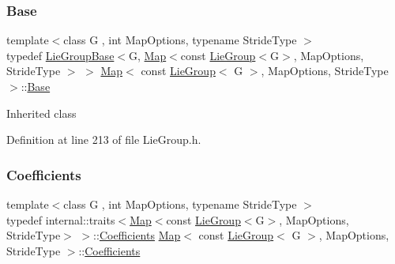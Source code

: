 \subsubsection{\texorpdfstring{Base}{Base}}
{\footnotesize\ttfamily template$<$class G , int Map\+Options, typename Stride\+Type $>$ \\
typedef \hyperlink{class_lie_group_base}{Lie\+Group\+Base}$<$G, \hyperlink{class_map_3_01const_01_lie_group_3_01_g_01_4_00_01_map_options_00_01_stride_type_01_4_a95174b5f6c93ceefa0fbc6ef6fdf65f7}{Map}$<$const \hyperlink{class_lie_group}{Lie\+Group}$<$G$>$, Map\+Options, Stride\+Type $>$ $>$ \hyperlink{class_map_3_01const_01_lie_group_3_01_g_01_4_00_01_map_options_00_01_stride_type_01_4_a95174b5f6c93ceefa0fbc6ef6fdf65f7}{Map}$<$ const \hyperlink{class_lie_group}{Lie\+Group}$<$ G $>$, Map\+Options, Stride\+Type $>$\+::\hyperlink{class_map_3_01const_01_lie_group_3_01_g_01_4_00_01_map_options_00_01_stride_type_01_4_ae8127dbfe0e6b6b515d319062f495883}{Base}\hspace{0.3cm}{\ttfamily [protected]}}

Inherited class 

Definition at line 213 of file Lie\+Group.\+h.

\hypertarget{class_map_3_01const_01_lie_group_3_01_g_01_4_00_01_map_options_00_01_stride_type_01_4_a670729f8e6ab1131541ef46da7d09274}{}\label{class_map_3_01const_01_lie_group_3_01_g_01_4_00_01_map_options_00_01_stride_type_01_4_a670729f8e6ab1131541ef46da7d09274} 
\subsubsection{\texorpdfstring{Coefficients}{Coefficients}}
{\footnotesize\ttfamily template$<$class G , int Map\+Options, typename Stride\+Type $>$ \\
typedef internal\+::traits$<$\hyperlink{class_map_3_01const_01_lie_group_3_01_g_01_4_00_01_map_options_00_01_stride_type_01_4_a95174b5f6c93ceefa0fbc6ef6fdf65f7}{Map}$<$const \hyperlink{class_lie_group}{Lie\+Group}$<$G$>$, Map\+Options, Stride\+Type$>$ $>$\+::\hyperlink{class_map_3_01const_01_lie_group_3_01_g_01_4_00_01_map_options_00_01_stride_type_01_4_a670729f8e6ab1131541ef46da7d09274}{Coefficients} \hyperlink{class_map_3_01const_01_lie_group_3_01_g_01_4_00_01_map_options_00_01_stride_type_01_4_a95174b5f6c93ceefa0fbc6ef6fdf65f7}{Map}$<$ const \hyperlink{class_lie_group}{Lie\+Group}$<$ G $>$, Map\+Options, Stride\+Type $>$\+::\hyperlink{class_map_3_01const_01_lie_group_3_01_g_01_4_00_01_map_options_00_01_stride_type_01_4_a670729f8e6ab1131541ef46da7d09274}{Coefficients}}


